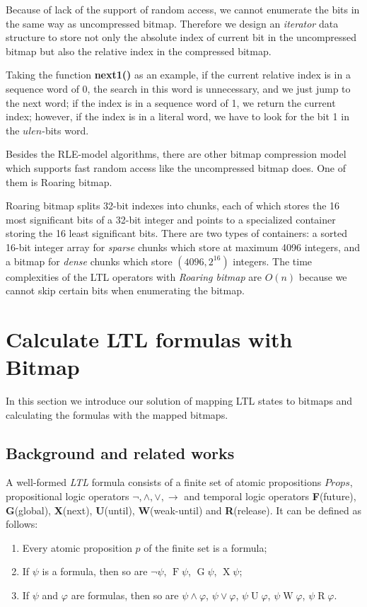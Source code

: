 Because of lack of the support of random access, we cannot enumerate the bits in the same way as uncompressed bitmap. Therefore we design an \emph{iterator} data structure to store not only the absolute index of current bit in the uncompressed bitmap but also the relative index in the compressed bitmap.

Taking the function \textbf{next1()} as an example, if the current relative index is in a sequence word of 0, the search in this word is unnecessary, and we just jump to the next word; if the index is in a sequence word of 1, we return the current index; however, if the index is in a literal word, we have to look for the bit 1 in the $ulen$-bits word.

Besides the RLE-model algorithms, there are other bitmap compression model which supports fast random access like the uncompressed bitmap does. One of them is Roaring bitmap\cite{lemire2015}.

Roaring bitmap splits 32-bit indexes into chunks, each of which stores the 16 most significant bits of a 32-bit integer and points to a specialized container storing the 16 least significant bits. There are two types of containers: a sorted 16-bit integer array for \emph{sparse} chunks which store at maximum 4096 integers, and a bitmap for \emph{dense} chunks which store $(4096, 2^{16})$ integers. The time complexities of the LTL operators with \emph{Roaring bitmap} are $O(n)$ because we cannot skip certain bits when enumerating the bitmap.


\section{Calculate LTL formulas with Bitmap}\label{sec:ltlbitmap} %

In this section we introduce our solution of mapping LTL states to bitmaps and calculating the formulas with the mapped bitmaps.

\subsection{Background and related works} %

A well-formed \emph{LTL} formula consists of a finite set of atomic propositions $Props$, propositional logic operators $\neg, \wedge, \vee, \rightarrow$ and temporal logic operators \textbf{F}(future), \textbf{G}(global), \textbf{X}(next), \textbf{U}(until), \textbf{W}(weak-until) and \textbf{R}(release). It can be defined as follows:
\begin{enumerate}
  \item Every atomic proposition $p$ of the finite set is a formula;
  \item If $\psi$ is a formula, then so are $\neg\psi$, $\mathop{F}\psi$, $\mathop{G}\psi$, $\mathop{X}\psi$;
  \item If $\psi$ and $\varphi$ are formulas, then so are $\psi\wedge\varphi$, $\psi\vee\varphi$, $\psi\mathrel{U}\varphi$, $\psi\mathrel{W}\varphi$, $\psi\mathrel{R}\varphi$.
\end{enumerate}

